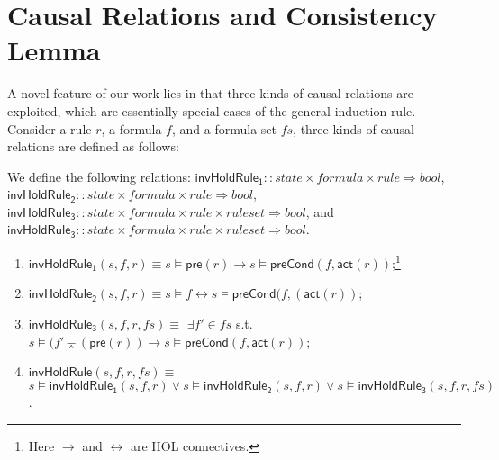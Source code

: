\documentclass{llncs}
\newlength{\fminilength}
\newenvironment{fmini}[1][\linewidth]
  {\setlength{\fminilength}{#1\fboxsep-2\fboxrule}%
   \vspace{2ex}\noindent\begin{lrbox}{\fminibox}\begin{minipage}{\fminilength}%
   \mbox{ }\hfill\vspace{-2.5ex}}%
  {\end{minipage}\end{lrbox}\vspace{1ex}\hspace{0ex}%
   \framebox{\usebox{\fminibox}}}
\newenvironment{specification}
{\noindent\scriptsize
\tt\begin{fmini}\begin{tabbing}X\=X12345\=XXXX\=XXXX\=XXXX\=XXXX\=XXXX
\=\+\kill} {\end{tabbing}\normalfont\end{fmini}}
\def \andc {\barwedge }
\begin{document}
\section{Causal Relations and Consistency Lemma} \label{sec:causal_rel}
\vspace{-0.3cm}
A novel feature of our work lies in that three kinds of causal
relations are exploited, which are essentially special cases of the
general induction rule.  Consider a rule $r$, a formula $f$, and a formula set $fs$, three
 kinds of causal relations are defined as follows:
 \begin{definition}
We define the following relations: $\mathsf{invHoldRule_1}::state \times formula\times rule \Rightarrow bool$, $\mathsf{invHoldRule_2}::state\times  formula\times rule  \Rightarrow bool$,  $\mathsf{invHoldRule_3}::state \times formula\times rule \times rule set\Rightarrow bool$, and $\mathsf{invHoldRule_3}::state \times formula\times rule \times rule set\Rightarrow bool$.
\vspace{-0.2cm}
\begin{enumerate}
\item $\mathsf{invHoldRule_1} (s,f,r) \equiv $$s \models \mathsf{pre}(r) \longrightarrow s \models \mathsf{preCond}(f ,\mathsf{act}(r))$;\footnote{Here  $\longrightarrow$ and $\longleftrightarrow$ are HOL connectives.  }
\item $\mathsf{invHoldRule_2}(s,f,r) \equiv  $$s \models f \longleftrightarrow s \models \mathsf{preCond}( f,(\mathsf{act}( r))$;
\item $\mathsf{invHoldRule_3}(s,f,r,fs) \equiv$  $\exists f' \in fs$ s.t.
$s \models ( f' \andc (\mathsf{pre}(r))  \longrightarrow s \models \mathsf{preCond}(f ,\mathsf{act}(r))$;
\item $\mathsf{invHoldRule}(s,f,r, fs) \equiv$   $s \models\mathsf{invHoldRule_1}(s,f,r) \vee s\models\mathsf{invHoldRule_2}(s,f,r) \vee s\models \mathsf{invHoldRule_3}(s,f,r,fs)$.
\end{enumerate}
\end{definition}
\vspace{-0.2cm}
\end{document}
